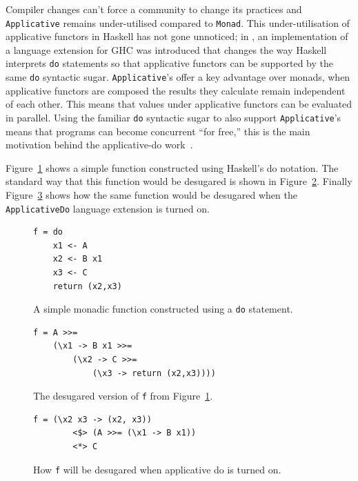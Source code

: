 Compiler changes can't force a community to change its practices and \texttt{Applicative} remains under-utilised compared to \texttt{Monad}. This under-utilisation of applicative functors in Haskell has not gone unnoticed; in \cite{applicativeDo}, an implementation of a language extension for GHC was introduced that changes the way Haskell interprets \texttt{do} statements so that applicative functors can be supported by the same \texttt{do} syntactic sugar. \texttt{Applicative}'s offer a key advantage over monads, when applicative functors are composed the results they calculate remain independent of each other. This means that values under applicative functors can be evaluated in parallel. Using the familiar \texttt{do} syntactic sugar to also support \texttt{Applicative}'s means that programs can become concurrent ``for free,'' this is the main motivation behind the applicative-do work~\citep{applicativeDo}.

Figure~\ref{doF} shows a simple function constructed using Haskell's do notation. The standard way that this function would be desugared is shown in Figure~\ref{fDesugar}. Finally Figure~\ref{fApDoDesugar} shows how the same function would be desugared when the \texttt{ApplicativeDo} language extension is turned on.

\begin{figure}[t]
\begin{lstlisting}
f = do
	x1 <- A
	x2 <- B x1
	x3 <- C
	return (x2,x3)
\end{lstlisting}
\caption{A simple monadic function constructed using a \texttt{do} statement.}
\label{doF}
\end{figure}

\begin{figure}[t]
\begin{lstlisting}
f = A >>=
	(\x1 -> B x1 >>=
		(\x2 -> C >>=
			(\x3 -> return (x2,x3))))
\end{lstlisting}
\caption{The desugared version of \texttt{f} from Figure~\ref{doF}.}
\label{fDesugar}
\end{figure}

\begin{figure}[t]
\begin{lstlisting}
f = (\x2 x3 -> (x2, x3))
        <$> (A >>= (\x1 -> B x1))
        <*> C                
\end{lstlisting}
\caption{How \texttt{f} will be desugared when applicative do is turned on.}
\label{fApDoDesugar}
\end{figure}

